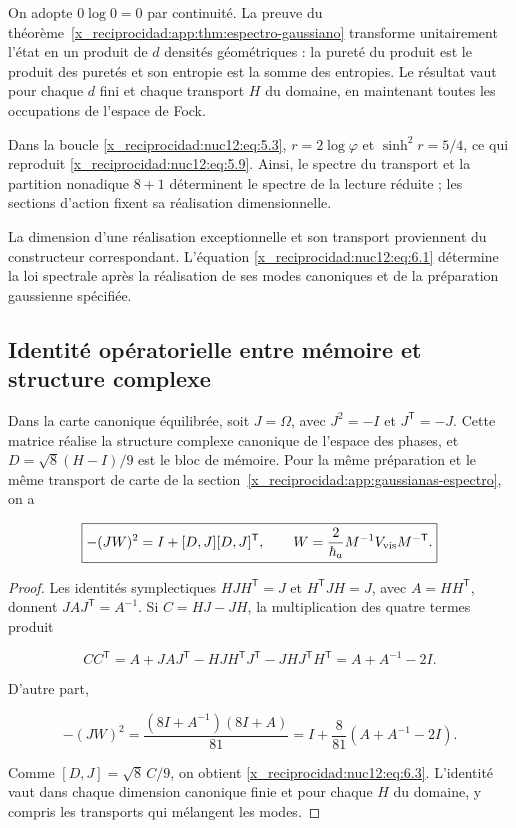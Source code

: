 On adopte \(0\log0=0\) par continuité. La preuve du théorème~\ref{x_reciprocidad:app:thm:espectro-gaussiano} transforme unitairement l’état en un produit de \(d\) densités géométriques : la pureté du produit est le produit des puretés et son entropie est la somme des entropies. Le résultat vaut pour chaque \(d\) fini et chaque transport \(H\) du domaine, en maintenant toutes les occupations de l’espace de Fock.

Dans la boucle \eqref{x_reciprocidad:nuc12:eq:5.3}, \(r=2\log\varphi\) et \(\sinh^2r=5/4\), ce qui reproduit \eqref{x_reciprocidad:nuc12:eq:5.9}. Ainsi, le spectre du transport et la partition nonadique \(8+1\) déterminent le spectre de la lecture réduite ; les sections d’action fixent sa réalisation dimensionnelle.

La dimension d’une réalisation exceptionnelle et son transport proviennent du constructeur correspondant. L’équation \eqref{x_reciprocidad:nuc12:eq:6.1} détermine la loi spectrale après la réalisation de ses modes canoniques et de la préparation gaussienne spécifiée.

\subsection{Identité opératorielle entre mémoire et structure complexe}

Dans la carte canonique équilibrée, soit \(J=\Omega\), avec \(J^2=-I\) et \(J^{\mathsf T}=-J\). Cette matrice réalise la structure complexe canonique de l’espace des phases, et \(D=\sqrt8(H-I)/9\) est le bloc de mémoire. Pour la même préparation et le même transport de carte de la section~\ref{x_reciprocidad:app:gaussianas-espectro}, on a



\begin{equation}
\boxed{-(JW)^2=I+[D,J][D,J]^{\mathsf T},\qquad
W=\frac{2}{\hbar_a}M^{-1}V_{\rm vis}M^{-\mathsf T}.}
\label{x_reciprocidad:nuc12:eq:6.3}
\end{equation}



\begin{proof}
Les identités symplectiques \(HJH^{\mathsf T}=J\) et \(H^{\mathsf T}JH=J\), avec \(A=HH^{\mathsf T}\), donnent \(JAJ^{\mathsf T}=A^{-1}\). Si \(C=HJ-JH\), la multiplication des quatre termes produit



\[
CC^{\mathsf T}
=A+JAJ^{\mathsf T}
-HJH^{\mathsf T}J^{\mathsf T}
-JHJ^{\mathsf T}H^{\mathsf T}
=A+A^{-1}-2I.
\]



D'autre part,



\[
-(JW)^2
=\frac{(8I+A^{-1})(8I+A)}{81}
=I+\frac8{81}(A+A^{-1}-2I).
\]



Comme \([D,J]=\sqrt8\,C/9\), on obtient \eqref{x_reciprocidad:nuc12:eq:6.3}. L’identité vaut dans chaque dimension canonique finie et pour chaque \(H\) du domaine, y compris les transports qui mélangent les modes.
\end{proof}

